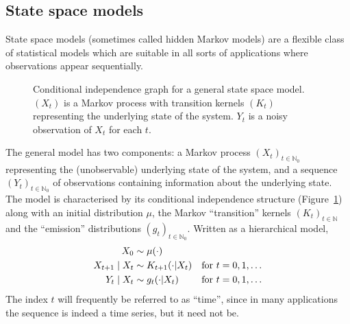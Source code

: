\subsection{State space models}
\label{sec:SSMs}
State space models (sometimes called hidden Markov models) are a flexible class of statistical models which are suitable in all sorts of applications where observations appear sequentially.
\begin{figure}[ht]
\centering
{}
\caption[State space model]{Conditional independence graph for a general state space model. $(X_t)$ is a Markov process with transition kernels $(K_t)$ representing the underlying state of the system. $Y_t$ is a noisy observation of $X_t$ for each $t$.}
\label{fig:SSM}
\end{figure}
The general model has two components: a Markov process $(X_t)_{t\in\mathbb{N}_0}$ representing the (unobservable) underlying state of the system, and a sequence $(Y_t)_{t\in\mathbb{N}_0}$ of observations containing information about the underlying state. The model is characterised by its conditional independence structure (Figure~\ref{fig:SSM}) along with an initial distribution $\mu$, the Markov ``transition'' kernels $(K_t)_{t\in\mathbb{N}}$ and the ``emission'' distributions $(g_t)_{t\in\mathbb{N}_0}$. 
Written as a hierarchical model,
\begin{align}
X_0 &\sim \mu(\cdot) & \notag\\
X_{t+1} \mid X_t &\sim K_{t+1}(\cdot | X_t) & \text{for } t=0, 1, \dots
        \label{eq:SSM_spec}\\
Y_t \mid X_t &\sim g_t(\cdot | X_t) & \text{for } t=0, 1, \dots \notag
\end{align}
The index $t$ will frequently be referred to as ``time'', since in many applications the sequence is indeed a time series, but it need not be.

